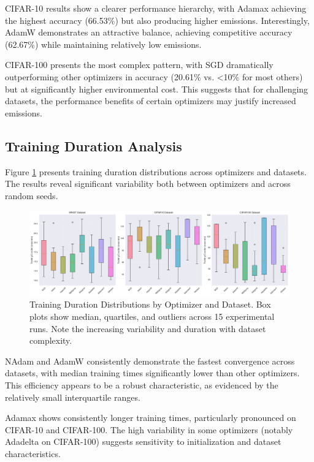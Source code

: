 \documentclass[conference]{IEEEtran}
\begin{document}
CIFAR-10 results show a clearer performance hierarchy, with Adamax achieving the highest accuracy (66.53\%) but also producing higher emissions. Interestingly, AdamW demonstrates an attractive balance, achieving competitive accuracy (62.67\%) while maintaining relatively low emissions.

CIFAR-100 presents the most complex pattern, with SGD dramatically outperforming other optimizers in accuracy (20.61\% vs. <10\% for most others) but at significantly higher environmental cost. This suggests that for challenging datasets, the performance benefits of certain optimizers may justify increased emissions.

\subsection{Training Duration Analysis}

Figure \ref{fig:training_duration} presents training duration distributions across optimizers and datasets. The results reveal significant variability both between optimizers and across random seeds.

\begin{figure}[htbp]
\centering
\includegraphics[width=\textwidth]{training_duration_boxplots.png}
\caption{Training Duration Distributions by Optimizer and Dataset. Box plots show median, quartiles, and outliers across 15 experimental runs. Note the increasing variability and duration with dataset complexity.}
\label{fig:training_duration}
\end{figure}

NAdam and AdamW consistently demonstrate the fastest convergence across datasets, with median training times significantly lower than other optimizers. This efficiency appears to be a robust characteristic, as evidenced by the relatively small interquartile ranges.

Adamax shows consistently longer training times, particularly pronounced on CIFAR-10 and CIFAR-100. The high variability in some optimizers (notably Adadelta on CIFAR-100) suggests sensitivity to initialization and dataset characteristics.
\end{document}
